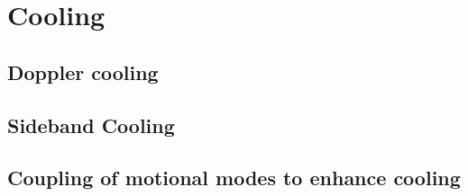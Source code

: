 \chapter{Cooling}
\label{chap:Cooling}

\section{Doppler cooling}

\section{Sideband Cooling}

\section{Coupling of motional modes to enhance cooling}